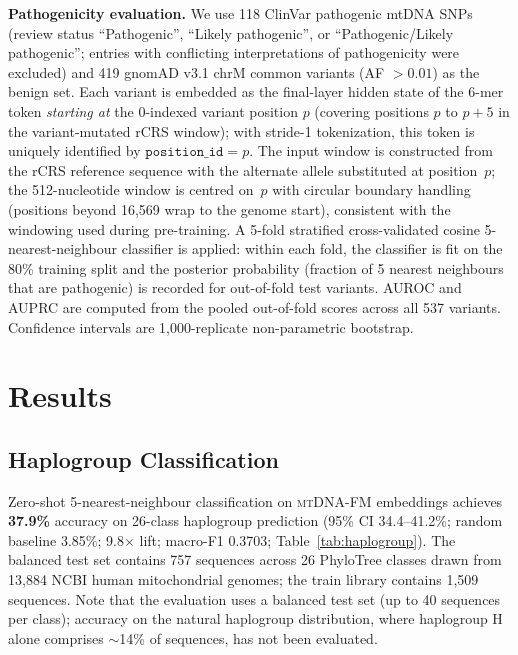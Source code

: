 \documentclass[10pt]{article}
\newcommand{\mtdnafm}{\textsc{mtDNA-FM}\xspace}
\begin{document}
\textbf{Pathogenicity evaluation.} We use 118 ClinVar pathogenic mtDNA SNPs (review status
``Pathogenic'', ``Likely pathogenic'', or ``Pathogenic/Likely pathogenic''; entries with
conflicting interpretations of pathogenicity were excluded) and 419 gnomAD v3.1
chrM common variants (AF $>0.01$) as the benign set. Each variant is embedded as the final-layer hidden state of the 6-mer token \emph{starting at}
the 0-indexed variant position $p$ (covering positions $p$ to $p{+}5$ in the variant-mutated
rCRS window); with stride-1 tokenization, this token is uniquely identified by
$\texttt{position\_id} = p$. The input window is constructed from the rCRS reference sequence
with the alternate allele substituted at position~$p$; the 512-nucleotide window is centred
on~$p$ with circular boundary handling (positions beyond 16,569 wrap to the genome start),
consistent with the windowing used during pre-training. A 5-fold stratified cross-validated
cosine 5-nearest-neighbour classifier is applied: within each fold, the classifier is fit on the
80\% training split and the posterior probability (fraction of 5 nearest neighbours that are
pathogenic) is recorded for out-of-fold test variants. AUROC and AUPRC are computed from the
pooled out-of-fold scores across all 537 variants. Confidence intervals are 1,000-replicate
non-parametric bootstrap.

\section{Results}
\label{sec:results}

\subsection{Haplogroup Classification}
\label{sec:haplo}

Zero-shot 5-nearest-neighbour classification on \mtdnafm embeddings achieves \textbf{37.9\%}
accuracy on 26-class haplogroup prediction (95\% CI 34.4--41.2\%; random baseline 3.85\%;
9.8$\times$ lift; macro-F1 0.3703; Table~\ref{tab:haplogroup}). The balanced test set contains
757 sequences across 26 PhyloTree classes drawn from 13,884 NCBI human mitochondrial genomes;
the train library contains 1,509 sequences. Note that the evaluation uses a balanced test set
(up to 40 sequences per class); accuracy on the natural haplogroup distribution, where
haplogroup H alone comprises $\sim$14\% of sequences, has not been evaluated.
\end{document}
